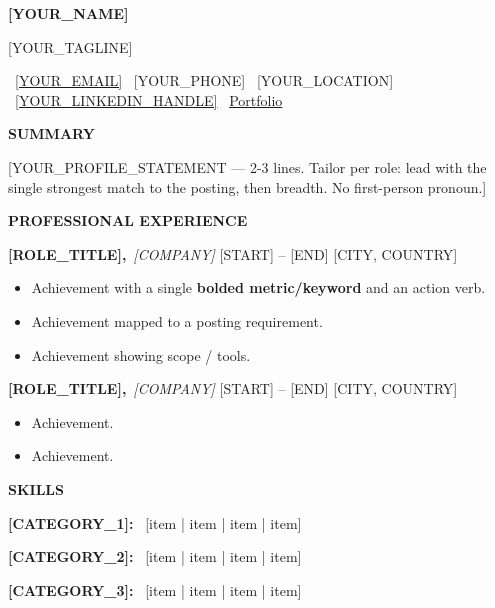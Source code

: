 \documentclass[10pt,a4paper]{article}
\newcommand{\cvsection}[2]{%
  \needspace{2\baselineskip}%
  \vspace{2pt}%
  {\color{accent}\large\bfseries #1\hspace{6pt}#2}\par
  \vspace{-5pt}{\color{accent}\rule{\linewidth}{0.9pt}}\par
  \vspace{2pt}%
}
\newcommand{\cventry}[4]{%
  \needspace{3\baselineskip}%
  {\parfillskip=0pt\relax
   \textbf{#1,}\ {\itshape\color{accent}#2}\hfill
   {\color{dim}#3 \textbar{} #4}\par}%
  \vspace{1pt}%
}
\newenvironment{cvbullets}{%
  \begin{itemize}[leftmargin=1.35em,itemsep=0.5pt,parsep=0pt,topsep=0.5pt,%
                  label={\color{accent}\small\textbullet}]
}{%
  \end{itemize}%
}
\newcommand{\skillgroup}[2]{%
  \textbf{#1:}~ #2\par\vspace{1.5pt}%
}
\newcommand{\contactsep}{\hspace{7pt}}
\begin{document}
{\centering
  {\color{accent}\fontsize{24}{28}\selectfont\bfseries [YOUR_NAME]}\par
  \vspace{2pt}
  {\color{dim}\normalsize [YOUR_TAGLINE]}\par   %
  \vspace{3pt}
  {\small
    \faEnvelope\ \href{mailto:[YOUR_EMAIL]}{[YOUR_EMAIL]}\contactsep
    \faPhone*\ [YOUR_PHONE]\contactsep
    \faMapMarker*\ [YOUR_LOCATION]\contactsep
    \faLinkedin\ \href{[YOUR_LINKEDIN_URL]}{[YOUR_LINKEDIN_HANDLE]}\contactsep
    \faGlobe\ \href{[YOUR_PORTFOLIO_URL]}{Portfolio}%
  }\par
}
\vspace{2pt}

\cvsection{\faUserTie}{SUMMARY}
[YOUR_PROFILE_STATEMENT — 2-3 lines. Tailor per role: lead with the single
strongest match to the posting, then breadth. No first-person pronoun.]

\cvsection{\faBriefcase}{PROFESSIONAL EXPERIENCE}

\cventry{[ROLE_TITLE]}{[COMPANY]}{[START] -- [END]}{[CITY, COUNTRY]}
\begin{cvbullets}
  \item [Achievement with a single \textbf{bolded metric/keyword} and an action verb.]
  \item [Achievement mapped to a posting requirement.]
  \item [Achievement showing scope / tools.]
\end{cvbullets}
\vspace{3pt}

\cventry{[ROLE_TITLE]}{[COMPANY]}{[START] -- [END]}{[CITY, COUNTRY]}
\begin{cvbullets}
  \item [Achievement.]
  \item [Achievement.]
\end{cvbullets}

\cvsection{\faTools}{SKILLS}
\skillgroup{[CATEGORY_1]}{[item | item | item | item]}
\skillgroup{[CATEGORY_2]}{[item | item | item | item]}
\skillgroup{[CATEGORY_3]}{[item | item | item | item]}
\end{document}
